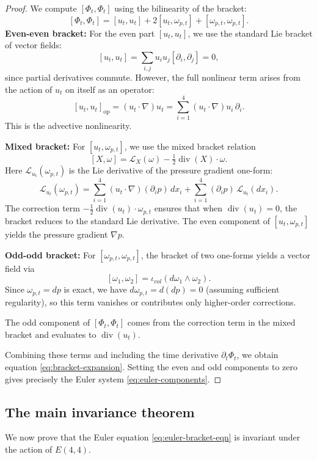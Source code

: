 \documentclass[reqno,10pt]{amsart}
\theoremstyle{plain}
\theoremstyle{definition}
\def\gE{E(4,4)}
\def\div{\operatorname{div}}
\begin{document}
\begin{proof}
We compute $[\Phi_t,\Phi_t]$ using the bilinearity of the bracket:
\[
  [\Phi_t,\Phi_t] = [u_t,u_t] + 2[u_t,\omega_{p,t}] + [\omega_{p,t},\omega_{p,t}].
\]
\textbf{Even-even bracket:} For the even part $[u_t,u_t]$, we use the standard Lie bracket of vector fields:
\[
  [u_t,u_t] = \sum_{i,j} u_i u_j [\partial_i,\partial_j] = 0,
\]
since partial derivatives commute. However, the full nonlinear term arises from the action of $u_t$ on itself as an operator:
\[
  [u_t, u_t]_{\text{op}} = (u_t\cdot\nabla)u_t = \sum_{i=1}^4 (u_t\cdot\nabla)u_i\,\partial_i.
\]
This is the advective nonlinearity.

\textbf{Mixed bracket:} For $[u_t,\omega_{p,t}]$, we use the mixed bracket relation
\[
  [X,\omega] = \mathcal{L}_X(\omega) - \tfrac{1}{2}\div(X)\cdot\omega.
\]
Here $\mathcal{L}_{u_t}(\omega_{p,t})$ is the Lie derivative of the pressure gradient one-form:
\[
  \mathcal{L}_{u_t}(\omega_{p,t}) = \sum_{i=1}^4 (u_t\cdot\nabla)(\partial_i p)\,dx_i + \sum_{i=1}^4 (\partial_i p)\,\mathcal{L}_{u_t}(dx_i).
\]
The correction term $-\tfrac{1}{2}\div(u_t)\cdot\omega_{p,t}$ ensures that when $\div(u_t)=0$, the bracket reduces to the standard Lie derivative. The even component of $[u_t,\omega_{p,t}]$ yields the pressure gradient $\nabla p$.

\textbf{Odd-odd bracket:} For $[\omega_{p,t},\omega_{p,t}]$, the bracket of two one-forms yields a vector field via
\[
  [\omega_1,\omega_2] = \iota_{vol}(d\omega_1\wedge\omega_2).
\]
Since $\omega_{p,t} = dp$ is exact, we have $d\omega_{p,t} = d(dp) = 0$ (assuming sufficient regularity), so this term vanishes or contributes only higher-order corrections.

The odd component of $[\Phi_t,\Phi_t]$ comes from the correction term in the mixed bracket and evaluates to $\div(u_t)$.

Combining these terms and including the time derivative $\partial_t\Phi_t$, we obtain equation \eqref{eq:bracket-expansion}. Setting the even and odd components to zero gives precisely the Euler system \eqref{eq:euler-components}.
\end{proof}

\subsection{The main invariance theorem}

We now prove that the Euler equation \eqref{eq:euler-bracket-eqn} is invariant under the action of $\gE$.
\end{document}

